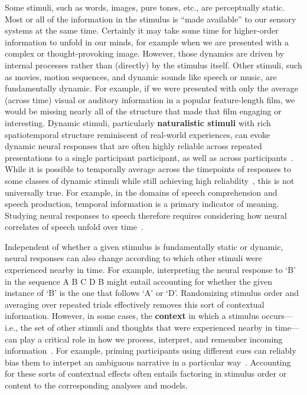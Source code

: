 \documentclass{llmxive}
\begin{document}
Some stimuli, such as words, images, pure tones, etc., are
perceptually static.  Most or all of the information in the stimulus
is ``made available'' to our sensory systems at the same time.
Certainly it may take some time for higher-order information to unfold
in our minds, for example when we are presented with a complex or
thought-provoking image.  However, those dynamics are driven by
internal processes rather than (directly) by the stimulus itself.
Other stimuli, such as movies, motion sequences, and dynamic sounds
like speech or music, are fundamentally dynamic.  For example, if we
were presented with only the average (across time) visual or auditory
information in a popular feature-length film, we would be missing
nearly all of the structure that made that film engaging or
interesting.  Dynamic stimuli, particularly \textbf{naturalistic
  stimuli} with rich spatiotemporal structure reminiscent of
real-world experiences, can evoke dynamic neural responses that are
often highly reliable across repeated presentations to a single
participant participant, as well as across
participants~\citep{ChenEtal17, KhosEtal21, KiEtal16, NastEtal18,
  HassEtal10, Finn21, ChanEtal20, FinnBand21, MannEtal18, OwenEtal21,
  HuthEtal12, HuthEtal16}.  While it is possible to temporally average
across the timepoints of responses to some classes of dynamic stimuli
while still achieving high reliability~\citep{NastEtal18}, this is not
universally true.  For example, in the domains of speech comprehension
and speech production, temporal information is a primary indicator of
meaning.  Studying neural responses to speech therefore requires
considering how neural correlates of speech unfold over
time~\citep{HamiEtal21, ProiEtal22}.

Independent of whether a given stimulus is fundamentally static or
dynamic, neural responses can also change according to which other
stimuli were experienced nearby in time.  For example, interpreting
the neural response to `B' in the sequence A B C D B might entail
accounting for whether the given instance of `B' is the one that
follows `A' or `D'.  Randomizing stimulus order and averaging over
repeated trials effectively removes this sort of contextual
information.  However, in some cases, the \textbf{context} in which a
stimulus occurs---i.e., the set of other stimuli and thoughts that
were experienced nearby in time---can play a critical role in how we
process, interpret, and remember incoming information~\citep{Mann20}.
For example, priming participants using different cues can reliably
bias them to interpet an ambiguous narrative in a particular
way~\citep{YeshEtal17}.  Accounting for these sorts of contextual
effects often entails factoring in stimulus order or content to the
corresponding analyses and models.
\end{document}
